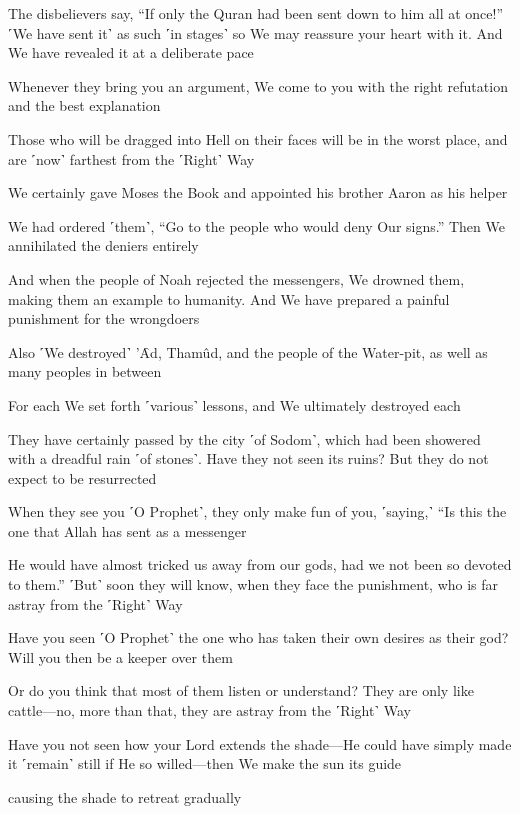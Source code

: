 The disbelievers say, “If only the Quran had been sent down to him all at once!” ˹We have sent it˺ as such ˹in stages˺ so We may reassure your heart with it. And We have revealed it at a deliberate pace

Whenever they bring you an argument, We come to you with the right refutation and the best explanation

Those who will be dragged into Hell on their faces will be in the worst place, and are ˹now˺ farthest from the ˹Right˺ Way

We certainly gave Moses the Book and appointed his brother Aaron as his helper

We had ordered ˹them˺, “Go to the people who would deny Our signs.” Then We annihilated the deniers entirely

And when the people of Noah rejected the messengers, We drowned them, making them an example to humanity. And We have prepared a painful punishment for the wrongdoers

Also ˹We destroyed˺ ’Ȃd, Thamûd, and the people of the Water-pit, as well as many peoples in between

For each We set forth ˹various˺ lessons, and We ultimately destroyed each

They have certainly passed by the city ˹of Sodom˺, which had been showered with a dreadful rain ˹of stones˺. Have they not seen its ruins? But they do not expect to be resurrected

When they see you ˹O Prophet˺, they only make fun of you, ˹saying,˺ “Is this the one that Allah has sent as a messenger

He would have almost tricked us away from our gods, had we not been so devoted to them.” ˹But˺ soon they will know, when they face the punishment, who is far astray from the ˹Right˺ Way

Have you seen ˹O Prophet˺ the one who has taken their own desires as their god? Will you then be a keeper over them

Or do you think that most of them listen or understand? They are only like cattle—no, more than that, they are astray from the ˹Right˺ Way

Have you not seen how your Lord extends the shade—He could have simply made it ˹remain˺ still if He so willed—then We make the sun its guide

causing the shade to retreat gradually


